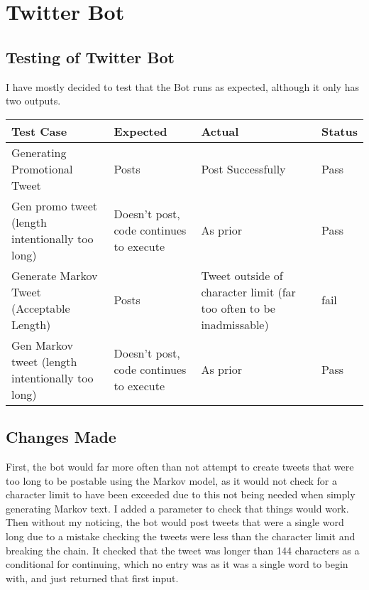\section{Twitter Bot}
\subsection{Testing of Twitter Bot}
I have mostly decided to test that the Bot runs as expected, although it only has two outputs.
\begin{center}
	\begin{tabular}{||m{15em} m{10em} m{10em} m{4em}||} 
		\hline
		Test Case & Expected & Actual & Status \\ [0.5ex] 
		\hline\hline
		Generating Promotional Tweet& Posts & Post Successfully & Pass \\ 
		\hline
		Gen promo tweet (length intentionally too long) & Doesn't post, code continues to execute & As prior& Pass\\
		\hline
		Generate Markov Tweet (Acceptable Length) & Posts & Tweet outside of character limit (far too often to be inadmissable) & fail\\
		\hline
		Gen Markov tweet (length intentionally too long) & Doesn't post, code continues to execute & As prior& Pass\\ [1ex] 
		\hline
	\end{tabular}
\end{center}

\subsection{Changes Made}
First, the bot would far more often than not attempt to create tweets that were too long to be postable using the Markov model, as it would not check for a character limit to have been exceeded due to this not being needed when simply generating Markov text. I added a parameter to check that things would work. \\
Then without my noticing, the bot would post tweets that were a single word long due to a mistake checking the tweets were less than the character limit and breaking the chain. It checked that the tweet was longer than 144 characters as a conditional for continuing, which no entry was as it was a single word to begin with, and just returned that first input.\\
